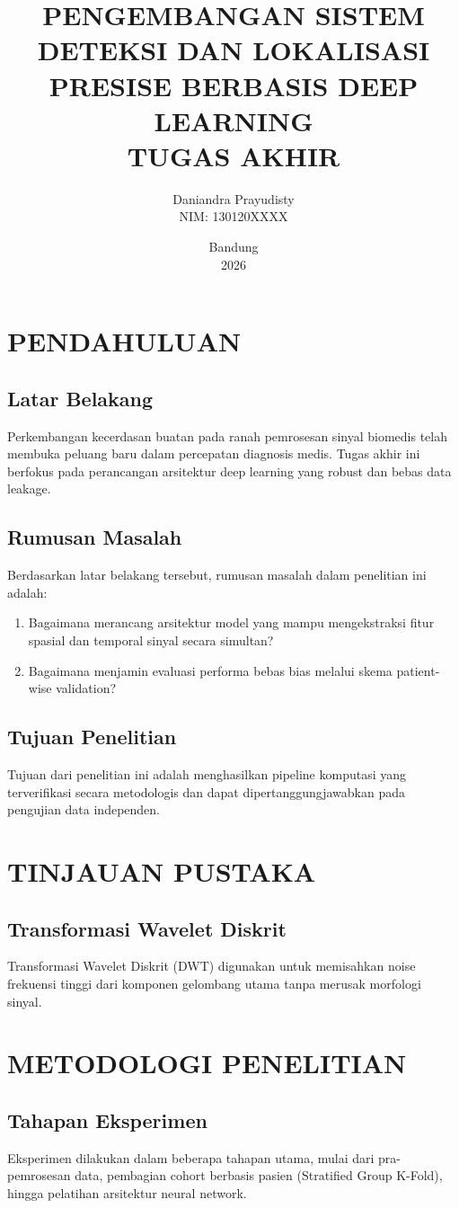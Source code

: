 \documentclass[12pt,a4paper]{report}
\begin{document}
\title{\textbf{PENGEMBANGAN SISTEM DETEKSI DAN LOKALISASI PRESISE BERBASIS DEEP LEARNING}\\
\vspace{1cm}
\large{TUGAS AKHIR}}
\author{Daniandra Prayudisty\\NIM: 130120XXXX}
\date{Bandung\\2026}

\maketitle

\chapter{PENDAHULUAN}
\section{Latar Belakang}
Perkembangan kecerdasan buatan pada ranah pemrosesan sinyal biomedis telah membuka peluang baru dalam percepatan diagnosis medis. Tugas akhir ini berfokus pada perancangan arsitektur deep learning yang robust dan bebas data leakage.

\section{Rumusan Masalah}
Berdasarkan latar belakang tersebut, rumusan masalah dalam penelitian ini adalah:
\begin{enumerate}
    \item Bagaimana merancang arsitektur model yang mampu mengekstraksi fitur spasial dan temporal sinyal secara simultan?
    \item Bagaimana menjamin evaluasi performa bebas bias melalui skema patient-wise validation?
\end{enumerate}

\section{Tujuan Penelitian}
Tujuan dari penelitian ini adalah menghasilkan pipeline komputasi yang terverifikasi secara metodologis dan dapat dipertanggungjawabkan pada pengujian data independen.

\chapter{TINJAUAN PUSTAKA}
\section{Transformasi Wavelet Diskrit}
Transformasi Wavelet Diskrit (DWT) digunakan untuk memisahkan noise frekuensi tinggi dari komponen gelombang utama tanpa merusak morfologi sinyal.

\chapter{METODOLOGI PENELITIAN}
\section{Tahapan Eksperimen}
Eksperimen dilakukan dalam beberapa tahapan utama, mulai dari pra-pemrosesan data, pembagian cohort berbasis pasien (Stratified Group K-Fold), hingga pelatihan arsitektur neural network.
\end{document}
